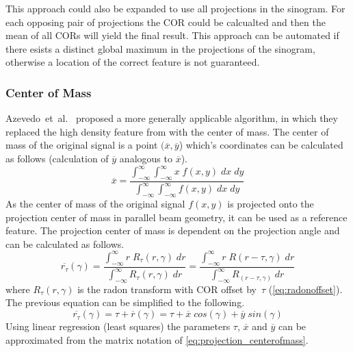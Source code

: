 \documentclass[10pt,journal,compsoc]{IEEEtran}
\begin{document}
This approach could also be expanded to use all projections in the sinogram.
For each opposing pair of projections the COR could be calcualted and then the mean of all CORs will yield the final result.
This approach can be automated if there esists a distinct global maximum in the projections of the sinogram, otherwise a location of the correct feature is not guaranteed.


\subsubsection{Center of Mass}\label{sssec:centerofmass}
Azevedo~et~al.~\cite{azevedo90} proposed a more generally applicable algorithm, in which they replaced the high density feature from \cite{crawford1988} with the center of mass.
The center of mass of the original signal is a point $(\overline{x},\overline{y}$) which's coordinates can be calculated as follows (calculation of $\overline{y}$ analogous to $\overline{x}$).
%
\begin{equation}
\overline{x} = \frac{
\int_{-\infty}^{\infty}\int_{-\infty}^{\infty}x\;f(x,y)\;dx\;dy
}
{
\int_{-\infty}^{\infty}\int_{-\infty}^{\infty}f(x,y)\;dx\;dy
}
\end{equation}
%
As the center of mass of the original signal $f(x,y)$ is projected onto the projection center of mass in parallel beam geometry, it can be used as a reference feature.
The projection center of mass is dependent on the projection angle and can be calculated as follows.
%
\begin{equation}
\overline{r_\tau}(\gamma) = \frac{
\int_{-\infty}^{\infty}r\;R_\tau(r,\gamma)\;dr
}
{
\int_{-\infty}^{\infty}R_\tau(r,\gamma)\;dr
}
=
\frac{
\int_{-\infty}^{\infty}r\;R(r-\tau,\gamma)\;dr
}
{
\int_{-\infty}^{\infty}R_(r-\tau,\gamma)\;dr
}
\end{equation}
%
where $R_\tau(r,\gamma)$ is the radon transform with COR offset by~$\tau$ (\cref{eq:radonoffset}).
The previous equation can be simplified to the following.
%
\begin{equation}
\label{eq:projection_centerofmass}
\overline{r_\tau}(\gamma) = \tau + \overline{r}(\gamma) = \tau + \overline{x}\;cos(\gamma) + \overline{y}\;sin(\gamma)
\end{equation}
%
Using linear regression (least squares) the parameters $\tau$, $\overline{x}$ and $\overline{y}$ can be approximated from the matrix notation of \cref{eq:projection_centerofmass}.
%
\end{document}
